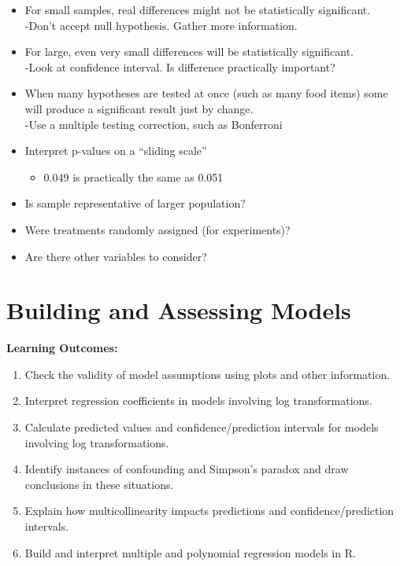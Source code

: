 \documentclass[
  letterpaper,
  DIV=11,
  numbers=noendperiod]{scrreprt}
\providecommand{\tightlist}{%
  \setlength{\itemsep}{0pt}\setlength{\parskip}{0pt}}\usepackage{longtable,booktabs,array}
\begin{document}
\begin{itemize}
\tightlist
\item
  For small samples, real differences might not be statistically
  significant.\\
  -Don't accept null hypothesis. Gather more information.\\
\item
  For large, even very small differences will be statistically
  significant.\\
  -Look at confidence interval. Is difference practically important?\\
\item
  When many hypotheses are tested at once (such as many food items) some
  will produce a significant result just by change.\\
  -Use a multiple testing correction, such as Bonferroni\\
\item
  Interpret p-values on a ``sliding scale''

  \begin{itemize}
  \tightlist
  \item
    0.049 is practically the same as 0.051
  \end{itemize}
\item
  Is sample representative of larger population?\\
\item
  Were treatments randomly assigned (for experiments)?\\
\item
  Are there other variables to consider?
\end{itemize}


\chapter{Building and Assessing
Models}\label{building-and-assessing-models}

\textbf{Learning Outcomes:}

\begin{enumerate}
\def\labelenumi{\arabic{enumi}.}
\setcounter{enumi}{30}
\tightlist
\item
  Check the validity of model assumptions using plots and other
  information.\\
\item
  Interpret regression coefficients in models involving log
  transformations.\\
\item
  Calculate predicted values and confidence/prediction intervals for
  models involving log transformations.\\
\item
  Identify instances of confounding and Simpson's paradox and draw
  conclusions in these situations.\\
\item
  Explain how multicollinearity impacts predictions and
  confidence/prediction intervals.\\
\item
  Build and interpret multiple and polynomial regression models in R.
\end{enumerate}
\end{document}
